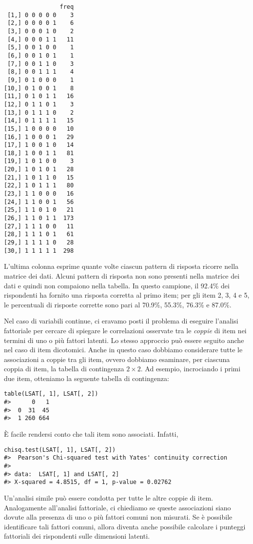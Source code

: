 \begin{lstlisting}
                freq
 [1,] 0 0 0 0 0    3
 [2,] 0 0 0 0 1    6
 [3,] 0 0 0 1 0    2
 [4,] 0 0 0 1 1   11
 [5,] 0 0 1 0 0    1
 [6,] 0 0 1 0 1    1
 [7,] 0 0 1 1 0    3
 [8,] 0 0 1 1 1    4
 [9,] 0 1 0 0 0    1
[10,] 0 1 0 0 1    8
[11,] 0 1 0 1 1   16
[12,] 0 1 1 0 1    3
[13,] 0 1 1 1 0    2
[14,] 0 1 1 1 1   15
[15,] 1 0 0 0 0   10
[16,] 1 0 0 0 1   29
[17,] 1 0 0 1 0   14
[18,] 1 0 0 1 1   81
[19,] 1 0 1 0 0    3
[20,] 1 0 1 0 1   28
[21,] 1 0 1 1 0   15
[22,] 1 0 1 1 1   80
[23,] 1 1 0 0 0   16
[24,] 1 1 0 0 1   56
[25,] 1 1 0 1 0   21
[26,] 1 1 0 1 1  173
[27,] 1 1 1 0 0   11
[28,] 1 1 1 0 1   61
[29,] 1 1 1 1 0   28
[30,] 1 1 1 1 1  298
\end{lstlisting}

\noindent
L'ultima colonna esprime quante volte ciascun pattern di risposta ricorre nella matrice dei dati. 
Alcuni pattern di risposta non sono presenti nella matrice dei dati e quindi non
compaiono nella tabella. 
In questo campione, il 92.4\% dei rispondenti ha fornito una risposta corretta al primo item; per gli item 2, 3, 4 e 5, le percentuali di risposte corrette sono pari al 70.9\%, 55.3\%, 76.3\% e 87.0\%.

Nel caso di variabili continue, ci eravamo posti il problema di eseguire l'analisi fattoriale per cercare di spiegare le correlazioni osservate tra le \emph{coppie} di item nei termini di uno o più fattori latenti. 
Lo stesso approccio può essere seguito anche nel caso di item dicotomici.  
Anche in questo caso dobbiamo considerare tutte le associazioni a coppie tra gli item, ovvero dobbiamo esaminare, per ciascuna coppia di item, la tabella di contingenza $2 \times 2$.  
Ad esempio, incrociando i primi due item, otteniamo la seguente tabella di contingenza:

\begin{lstlisting}
table(LSAT[, 1], LSAT[, 2])
#>      0   1
#>  0  31  45
#>  1 260 664
\end{lstlisting}

\noindent
È facile rendersi conto che tali item sono associati.
Infatti,

\begin{lstlisting}
chisq.test(LSAT[, 1], LSAT[, 2])
#>  Pearson's Chi-squared test with Yates' continuity correction
#>
#> data:  LSAT[, 1] and LSAT[, 2] 
#> X-squared = 4.8515, df = 1, p-value = 0.02762
\end{lstlisting}

\noindent
Un'analisi simile può essere condotta per tutte le altre coppie di item.
Analogamente all'analisi fattoriale, ci chiediamo se queste associazioni siano dovute alla presenza di uno o più fattori comuni non misurati. 
Se è possibile identificare tali fattori comuni, allora diventa anche possibile calcolare i punteggi fattoriali dei rispondenti sulle dimensioni latenti. 

